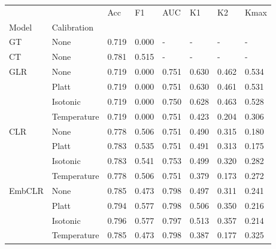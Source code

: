 \begin{tabular}{llllllll}
\toprule
 &  & Acc & F1 & AUC & K1 & K2 & Kmax \\
Model & Calibration &  &  &  &  &  &  \\
\midrule
GT & None & 0.719 & 0.000 & - & - & - & - \\
\cline{1-8}
CT & None & 0.781 & 0.515 & - & - & - & - \\
\cline{1-8}
\multirow[t]{4}{*}{GLR} & None & 0.719 & 0.000 & 0.751 & 0.630 & 0.462 & 0.534 \\
 & Platt & 0.719 & 0.000 & 0.751 & 0.630 & 0.461 & 0.531 \\
 & Isotonic & 0.719 & 0.000 & 0.750 & 0.628 & 0.463 & 0.528 \\
 & Temperature & 0.719 & 0.000 & 0.751 & 0.423 & 0.204 & 0.306 \\
\cline{1-8}
\multirow[t]{4}{*}{CLR} & None & 0.778 & 0.506 & 0.751 & 0.490 & 0.315 & 0.180 \\
 & Platt & 0.783 & 0.535 & 0.751 & 0.491 & 0.313 & 0.175 \\
 & Isotonic & 0.783 & 0.541 & 0.753 & 0.499 & 0.320 & 0.282 \\
 & Temperature & 0.778 & 0.506 & 0.751 & 0.379 & 0.173 & 0.272 \\
\cline{1-8}
\multirow[t]{4}{*}{EmbCLR} & None & 0.785 & 0.473 & 0.798 & 0.497 & 0.311 & 0.241 \\
 & Platt & 0.794 & 0.577 & 0.798 & 0.506 & 0.350 & 0.216 \\
 & Isotonic & 0.796 & 0.577 & 0.797 & 0.513 & 0.357 & 0.214 \\
 & Temperature & 0.785 & 0.473 & 0.798 & 0.387 & 0.177 & 0.325 \\
\cline{1-8}
\bottomrule
\end{tabular}
